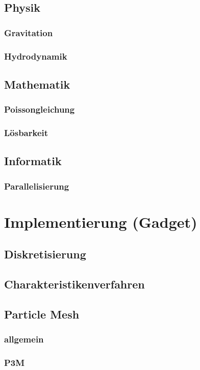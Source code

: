 \documentclass{beamer}
\begin{document}
\subsection{Physik}
\subsubsection{Gravitation}
\subsubsection{Hydrodynamik}
\subsection{Mathematik}
\subsubsection{Poissongleichung}
\subsubsection{Lösbarkeit}
\subsection{Informatik}
\subsubsection{Parallelisierung}

\section{Implementierung (Gadget)}
\subsection{Diskretisierung}
\subsection{Charakteristikenverfahren}
\subsection{Particle Mesh}
\subsubsection{allgemein}
\subsubsection{P3M}
\end{document}
